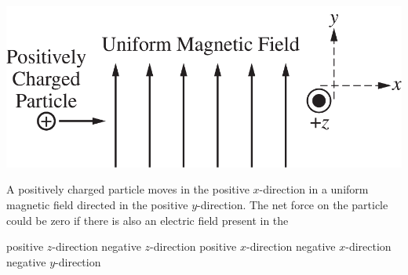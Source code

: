 
\begin{center}
    \includegraphics[scale=0.3]{images/img-014-028.png}
\end{center}

\begin{questions}\setcounter{question}{26}\question
A positively charged particle moves in the positive $x$-direction in a uniform magnetic field directed in the positive $y$-direction. The net force on the particle could be zero if there is also an electric field present in the

\begin{choices}
    \choice positive $z$-direction 
    \choice negative $z$-direction 
    \choice positive $x$-direction 
    \choice negative $x$-direction 
    \choice negative $y$-direction
\end{choices}
\end{questions}
